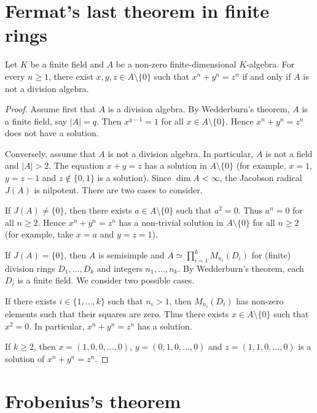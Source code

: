 \section{Fermat's last theorem in finite rings}

\begin{theorem}
    Let $K$ be a finite field and $A$ be a non-zero finite-dimensional $K$-algebra.
    For every $n\geq1$, there exist $x,y,z\in A\setminus\{0\}$ 
    such that $x^n+y^n=z^n$ if and only if 
    $A$ is not a division algebra.
\end{theorem}

\begin{proof}
    Assume first that $A$ is a division algebra. By Wedderburn's theorem, 
    $A$ is a finite field, say $|A|=q$. Then $x^{q-1}=1$ for all $x\in A\setminus\{0\}$.
    Hence $x^n+y^n=z^n$ does not have a solution. 
    
    Conversely, assume that $A$ is not a division algebra. In particular, 
    $A$ is not a field and $|A|>2$. The equation $x+y=z$ has a solution in $A\setminus\{0\}$ (for example, $x=1$, $y=z-1$ and $z\not\in\{0,1\}$ is a solution). Since
    $\dim A<\infty$, the Jacobson radical $J(A)$ is nilpotent. There are two 
    cases to consider. 
    
    If $J(A)\ne\{0\}$, 
    then there exists $a\in A\setminus\{0\}$ such that $a^2=0$. Thus $a^n=0$ 
    for all $n\geq2$. Hence $x^n+y^n=z^n$ has a non-trivial
    solution in $A\setminus\{0\}$ for all $n\geq2$ (for example, take 
    $x=a$ and $y=z=1$).
    
    If $J(A)=\{0\}$, then $A$ is semisimple and 
    $A\simeq\prod_{i=1}^k M_{n_i}(D_i)$ for (finite) division rings $D_1,\dots,D_k$
    and integers $n_1,\dots,n_k$. By Wedderburn's theorem, each $D_i$ is a finite
    field. We consider two possible cases. 
    
    If there exists $i\in\{1,\dots,k\}$ such that $n_i>1$, then
    $M_{n_i}(D_i)$ has non-zero elements such that their squares are zero. Thus 
    there exists $x\in A\setminus\{0\}$ such that $x^2=0$. In particular, 
    $x^n+y^n=z^n$ has a solution. 
    
    If $k\geq 2$, then $x=(1,0,0,\dots,0)$, $y=(0,1,0,\dots,0)$ 
    and $z=(1,1,0,\dots,0)$ is a solution of $x^n+y^n=z^n$.
\end{proof}


\section{Frobenius's theorem}

